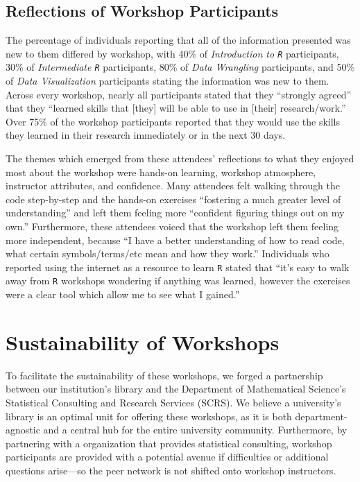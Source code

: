 \documentclass[12pt]{article}
\begin{document}
\subsection{Reflections of Workshop Participants} 

\quad The percentage of individuals reporting that all of the information
presented was new to them differed by workshop, with 40\% of \emph{Introduction
to \texttt{R}} participants, 30\% of \emph{Intermediate \texttt{R}}
participants, 80\% of \emph{Data Wrangling} participants, and 50\% of 
\emph{Data Visualization} participants stating the information was new to them.
Across every workshop, nearly all participants stated that they ``strongly
agreed'' that they ``learned skills that [they] will be able to use in [their]
research/work.'' Over 75\% of the workshop participants reported that they would
use the skills they learned in their research immediately or in the next 30
days. 

\quad The themes which emerged from these attendees' reflections to what they 
enjoyed most about the workshop were hands-on learning, workshop atmosphere,
instructor attributes, and confidence. Many attendees felt walking through the
code step-by-step and the hands-on exercises ``fostering a much greater level of
understanding'' and left them feeling more ``confident figuring things out on my
own.'' Furthermore, these attendees voiced that the workshop left them feeling
more independent, because ``I have a better understanding of how to read code, 
what certain symbols/terms/etc mean and how they work.'' Individuals who
reported using the internet as a resource to learn \texttt{R} stated that
``it's easy to walk away from \texttt{R} workshops wondering if anything was
learned, however the exercises were a clear tool which allow me to see what I 
gained.''  

\section{Sustainability of Workshops}  
\label{sec:sustainability}

\quad To facilitate the sustainability of these workshops, we forged a
partnership between our institution's library and the Department of Mathematical
Science's Statistical Consulting and Research Services (SCRS). We believe a 
university's library is an optimal unit for offering these workshops, as it is
both department-agnostic and a central hub for the entire university community.
Furthermore, by partnering with a organization that provides statistical
consulting, workshop participants are provided with a potential avenue if
difficulties or additional questions arise---so the peer network is not shifted 
onto workshop instructors. 
\end{document}

